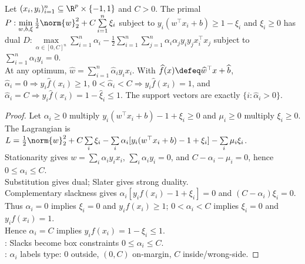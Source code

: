 \begin{proposition} \label{prop:sl-soft-margin-dual-kkt} \\
Let $(x_i,y_i)_{i=1}^n\subseteq\R^p\times\{-1,1\}$ and $C>0$. The primal $P:\min\limits_{w,b,\xi}\frac12\norm{w}_2^2+C\sum\limits_{i=1}^n\xi_i$ subject to $y_i(w^\top x_i+b)\geq1-\xi_i$ and $\xi_i\geq0$ has dual $D:\max\limits_{\alpha\in[0,C]^n}\sum\limits_{i=1}^n\alpha_i-\frac12\sum\limits_{i=1}^n\sum\limits_{j=1}^n\alpha_i\alpha_jy_iy_jx_i^\top x_j$ subject to $\sum\limits_{i=1}^n\alpha_i y_i=0$.\\
At any optimum, $\widehat{w}=\sum\limits_{i=1}^n\widehat{\alpha}_iy_ix_i$. With $\widehat{f}(x)\defeq\widehat{w}^\top x+\widehat{b}$, $\widehat{\alpha}_i=0\Rightarrow y_i\widehat{f}(x_i)\geq1$, $0<\widehat{\alpha}_i<C\Rightarrow y_i\widehat{f}(x_i)=1$, and $\widehat{\alpha}_i=C\Rightarrow y_i\widehat{f}(x_i)=1-\widehat{\xi}_i\leq1$. The support vectors are exactly $\{i:\widehat{\alpha}_i>0\}$.
\end{proposition}
\begin{proof} Let $\alpha_i\geq0$ multiply $y_i(w^\top x_i+b)-1+\xi_i\geq0$ and $\mu_i\geq0$ multiply $\xi_i\geq0$.\\
The Lagrangian is $L=\frac12\norm{w}_2^2+C\sum\limits_i\xi_i-\sum\limits_i\alpha_i[y_i(w^\top x_i+b)-1+\xi_i]-\sum\limits_i\mu_i\xi_i$.\\
Stationarity gives $w=\sum\limits_i\alpha_i y_i x_i$, $\sum\limits_i\alpha_i y_i=0$, and $C-\alpha_i-\mu_i=0$, hence $0\leq\alpha_i\leq C$.\\
Substitution gives dual; Slater gives strong duality.\\
Complementary slackness gives $\alpha_i[y_i f(x_i)-1+\xi_i]=0$ and $(C-\alpha_i)\xi_i=0$.\\
Thus $\alpha_i=0$ implies $\xi_i=0$ and $y_i f(x_i)\geq1$; $0<\alpha_i<C$ implies $\xi_i=0$ and $y_i f(x_i)=1$.\\
Hence $\alpha_i=C$ implies $y_i f(x_i)=1-\xi_i\leq1$.\\
: Slacks become box constraints $0\leq\alpha_i\leq C$.\\
: $\alpha_i$ labels type: $0$ outside, $(0,C)$ on-margin, $C$ inside/wrong-side.
\end{proof}

